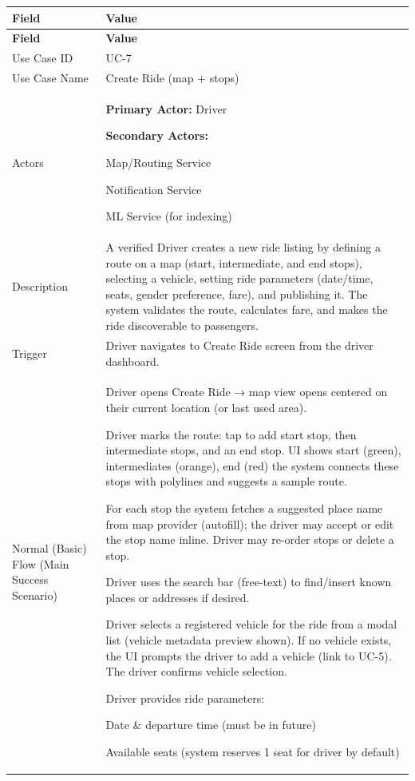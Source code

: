 \begin{longtable}{|p{3.5cm}|p{12cm}|}
\hline
\rowcolor{lightgray!30}
\textbf{Field} & \textbf{Value} \\
\hline
\endfirsthead
\hline
\rowcolor{lightgray!30}
\textbf{Field} & \textbf{Value} \\
\hline
\endhead
\hline
\endfoot
Use Case ID & UC-7 \\
\hline
Use Case Name & Create Ride (map + stops) \\
\hline
Actors &
\textbf{Primary Actor:} Driver

\textbf{Secondary Actors:}

Map/Routing Service

Notification Service

ML Service (for indexing) \\
\hline
Description &
A verified Driver creates a new ride listing by defining a route on a map (start, intermediate, and end stops), selecting a vehicle, setting ride parameters (date/time, seats, gender preference, fare), and publishing it. The system validates the route, calculates fare, and makes the ride discoverable to passengers. \\
\hline
Trigger &
Driver navigates to Create Ride screen from the driver dashboard. \\
\hline
Normal (Basic) Flow (Main Success Scenario) &
Driver opens Create Ride → map view opens centered on their current location (or last used area).

Driver marks the route: tap to add start stop, then intermediate stops, and an end stop. UI shows start (green), intermediates (orange), end (red) the system connects these stops with polylines and suggests a sample route.

For each stop the system fetches a suggested place name from map provider (autofill); the driver may accept or edit the stop name inline. Driver may re-order stops or delete a stop.

Driver uses the search bar (free-text) to find/insert known places or addresses if desired.

Driver selects a registered vehicle for the ride from a modal list (vehicle metadata preview shown). If no vehicle exists, the UI prompts the driver to add a vehicle (link to UC-5). The driver confirms vehicle selection.

Driver provides ride parameters:

Date \& departure time (must be in future)

Available seats (system reserves 1 seat for driver by default)


\end{longtable}
